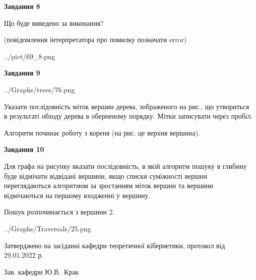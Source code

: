 \documentclass[12pt, ukrainian]{article}
\begin{document}
{\begin {large}
{\begin {center}\textbf{Завдання 8}\end {center}}\par
Що буде виведено за виконання?\par
 (повідомлення інтерпретатора про помилку позначати error)\par
\begin{center}
	{../pict/69_8.png}
\end{center}
\newpage

{\begin {center}\textbf{Завдання 9}\end {center}}\par

\begin{center}
	{../Graphs/trees/76.png}
\end{center}
Указати послідовність міток вершин дерева, зображеного на рис., що утвориться в результаті обходу дерева в оберненому порядку. Мітки записувати через пробіл.\par Алгоритм починає роботу з кореня (на рис. це верхня вершина).\par
\newpage

{\begin {center}\textbf{Завдання 10}\end {center}}\par
Для графа на рисунку вказати послідовність, в якій алгоритм пошуку в глибину буде відмічати відвідані вершини, якщо списки суміжності вершин переглядаються алгоритмом за зростанням міток вершин та вершини відмічаються на першому вход\-женні у вершину.\par
Пошук розпочинається з вершини 2.\par

\begin{center}
	{../Graphs/Traversals/25.png}
\end{center}\par
\newpage


\end {large}
}
{\smallskip \begin {small} Затверджено на засіданні кафедри теоретичної кібернетики, протокол  від   29.01.2022 р.\par\smallskip\smallskip
{\parbox {6.5 cm}{Зав. кафедри \dotfill Ю.В.~Крак}} \end{small}}
\end{document}
